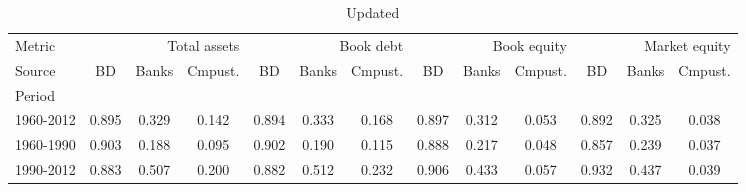
    \begin{table}[htbp]
      \centering
      \caption{Updated}
      \label{tab:Table 2}
      \small
      \begin{tabular}{lcccccccccccc}
\toprule
Metric & \multicolumn{3}{r}{Total assets} & \multicolumn{3}{r}{Book debt} & \multicolumn{3}{r}{Book equity} & \multicolumn{3}{r}{Market equity} \\
Source & BD & Banks & Cmpust. & BD & Banks & Cmpust. & BD & Banks & Cmpust. & BD & Banks & Cmpust. \\
Period &  &  &  &  &  &  &  &  &  &  &  &  \\
\midrule
1960-2012 & 0.895 & 0.329 & 0.142 & 0.894 & 0.333 & 0.168 & 0.897 & 0.312 & 0.053 & 0.892 & 0.325 & 0.038 \\
1960-1990 & 0.903 & 0.188 & 0.095 & 0.902 & 0.190 & 0.115 & 0.888 & 0.217 & 0.048 & 0.857 & 0.239 & 0.037 \\
1990-2012 & 0.883 & 0.507 & 0.200 & 0.882 & 0.512 & 0.232 & 0.906 & 0.433 & 0.057 & 0.932 & 0.437 & 0.039 \\
\bottomrule
\end{tabular}

    \end{table}
    